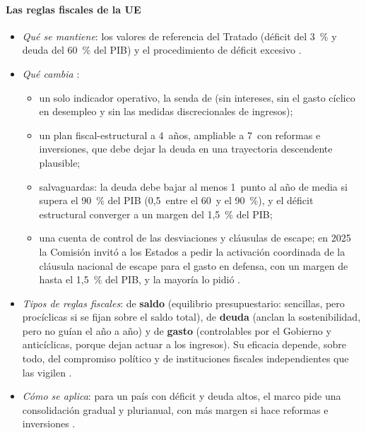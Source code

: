 \documentclass[11pt]{article}
\begin{document}
\paragraph{Las reglas fiscales de la UE}
\begin{itemize}
\item \emph{Qué se mantiene}: los valores de referencia del Tratado (déficit del 3~\% y deuda del 60~\% del PIB) y el procedimiento de déficit excesivo \parencite{TFUE2012Protocolo12}.
\item \emph{Qué cambia} \parencite{RegUE2024Preventivo,RegUE2024Correctivo} :
  \begin{itemize}
  \item un solo indicador operativo, la senda de  (sin intereses, sin el gasto cíclico en desempleo y sin las medidas discrecionales de ingresos);
  \item un plan fiscal-estructural a 4~años, ampliable a 7~con reformas e inversiones, que debe dejar la deuda en una trayectoria descendente plausible;
  \item salvaguardas: la deuda debe bajar al menos 1~punto al año de media si supera el 90~\% del PIB (0,5~entre el 60~y el 90~\%), y el déficit estructural converger a un margen del 1,5~\% del PIB;
  \item una cuenta de control de las desviaciones y cláusulas de escape; en 2025 la Comisión invitó a los Estados a pedir la activación coordinada de la cláusula nacional de escape para el gasto en defensa, con un margen de hasta el 1,5~\% del PIB, y la mayoría lo pidió \parencite{CE2025Defensa}.
  \end{itemize}
\item \emph{Tipos de reglas fiscales}: de \textbf{saldo} (equilibrio presupuestario: sencillas, pero procíclicas si se fijan sobre el saldo total), de \textbf{deuda} (anclan la sostenibilidad, pero no guían el año a año) y de \textbf{gasto} (controlables por el Gobierno y anticíclicas, porque dejan actuar a los ingresos). Su eficacia depende, sobre todo, del compromiso político y de instituciones fiscales independientes que las vigilen \parencite{Schaechter2012Reglas}.
\item \emph{Cómo se aplica}: para un país con déficit y deuda altos, el marco pide una consolidación gradual y plurianual, con más margen si hace reformas e inversiones .
\end{itemize}
\end{document}
